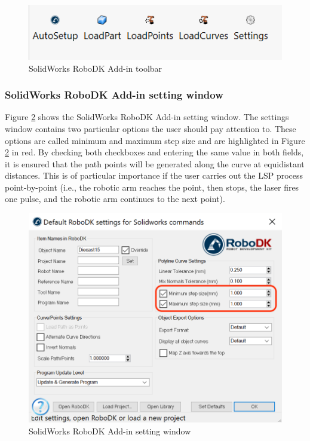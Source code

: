 \begin{figure}[h]
    \centering
    \includegraphics[width=0.6\linewidth]{img/solidworks_toolbar.PNG}
    \caption{SolidWorks RoboDK Add-in toolbar}
    \label{fig:solidworkstoolbar}
\end{figure}


\subsubsection*{SolidWorks RoboDK Add-in setting window}

Figure \ref{fig:solidworkssettings} shows the SolidWorks RoboDK Add-in setting window. The settings window contains two particular options the user should pay attention to. These options are called minimum and maximum step size and are highlighted in Figure \ref{fig:solidworkssettings} in red. By checking both checkboxes and entering the same value in both fields, it is ensured that the path points will be generated along the curve at equidistant distances. This is of particular importance if the user carries out the LSP process  point-by-point (i.e., the robotic arm reaches the point, then stops, the laser fires one pulse, and the robotic arm continues to the next point).


\begin{figure}[h]
    \centering
    \includegraphics[width=1.0\linewidth]{img/settings_add_in_v_2.png}
    \caption{SolidWorks RoboDK Add-in setting window}
    \label{fig:solidworkssettings}
\end{figure}







